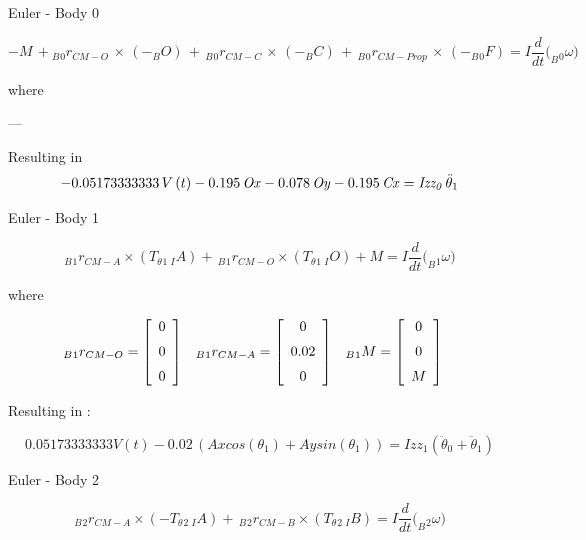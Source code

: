 Euler - Body 0

 \begin{equation}\label{euler0}
 -M \, +{_B}{_0}{r}_{CM-O}\, \times \, (-{_B}{O})\, + \,_B{_0}{r}_{CM-C} \,\times\, (-{_B}{C}) \,+\, {_B}{_0}{r}_{CM-Prop} \, \times \, (-_B{_0}{F}) = I  \frac{d}{dt}(_B{_0}{{\omega})}
\end{equation}

where

---

Resulting in 
\begin{equation}\label{euler0res}
- 0.05173333333\,V \left( t \right) - 0.195\,{\it Ox}- 0.078\,{\it Oy}
- 0.195\,{\it Cx}={\it Izz_{0}}\,\ddot\theta_{{1}} 
\end{equation}


Euler - Body 1 

\begin{equation}\label{euler1}
	_B{_1}{r}_{CM-A}\times (T_\theta{_1} \, {_I}{A}) + \,_B{_1}{r}_{CM-O} \times (T_\theta{_1} \, {_I}{O}) + {M} = I  \frac{d}{dt}(_B{_1}{\omega)}
\end{equation}


where

\begin{align*}
_B{_1}{r}_{CM-O} &= \left[ \begin {array}{c} 0\\ \noalign{\medskip}0\\ \noalign{\medskip}0
\end {array} \right] &
_B{_1}{r}_{CM-A} &= \left[ \begin {array}{c} 0\\ \noalign{\medskip}0.02\\ \noalign{\medskip}0
\end {array} \right]&
_B{_1}{M} &= \left[ \begin {array}{c} 0\\ \noalign{\medskip}0\\ \noalign{\medskip}M
\end {array} \right]&
\end{align*}

Resulting in :

\begin{equation}\label{euler1end}
0.05173333333 V(t) - 0.02\, (Ax cos(\theta{_1}) + Ay sin(\theta{_1})) = Izz_{{1}}(\ddot\theta_{{0}}+\ddot\theta_{{1}} )
\end{equation}

Euler - Body 2 

\begin{equation}\label{euler2}
	_B{_2}{r}_{CM-A}\times (-T_\theta{_2} \, {_I}{A}) + \,_B{_2}{r}_{CM-B} \times (T_\theta{_2} \, {_I}{B}) = I  \frac{d}{dt}(_B{_2}{\omega)}
\end{equation}

